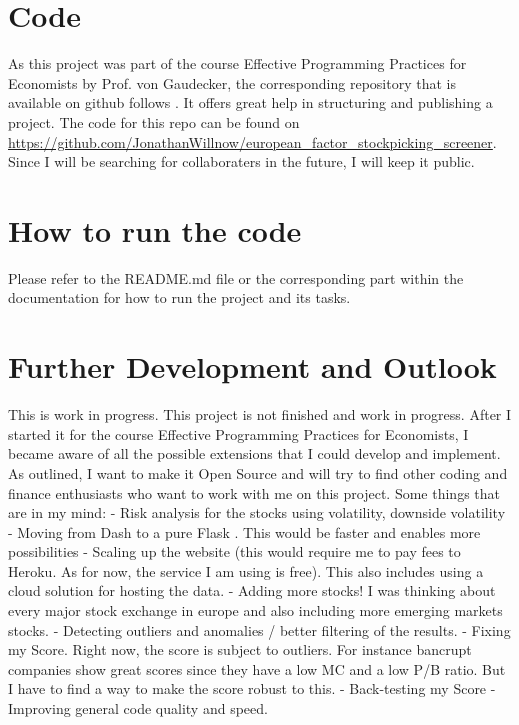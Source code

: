 \documentclass[11pt, a4paper, leqno]{article}
\begin{document}
\section{Code}
As this project was part of the course Effective Programming Practices for Economists by Prof. von Gaudecker, the corresponding repository 
that is available on github follows \citet{GaudeckerEconProjectTemplates}. It offers great help in structuring and publishing a project. 
The code for this repo can be found on \url{https://github.com/JonathanWillnow/european_factor_stockpicking_screener}. Since I will be searching for collaboraters in the future, I will keep it public.

\section{How to run the code}
Please refer to the README.md file or the corresponding part within the documentation for how to run the project and its tasks.

\section{Further Development and Outlook}
This is work in progress. This project is not finished and work in progress. After I started it for the course Effective Programming Practices for Economists, 
I became aware of all the possible extensions that I could develop and implement. 
As outlined, I want to make it Open Source and will try to find other coding and finance enthusiasts who want to work with me on this project.
Some things that are in my mind:
- Risk analysis for the stocks using volatility, downside volatility
- Moving from Dash to a pure Flask . This would be faster and enables more possibilities
- Scaling up the website (this would require me to pay fees to Heroku. As for now, the service I am using is free). This also includes using a cloud solution for hosting the data.
- Adding more stocks! I was thinking about every major stock exchange in europe and also including more emerging markets stocks.
- Detecting outliers and anomalies / better filtering of the results.
- Fixing my Score. Right now, the score is subject to outliers. For instance bancrupt companies show great scores since they have a low MC and a low P/B ratio. But I have to find a way to make the score robust to this.
- Back-testing my Score
- Improving general code quality and speed.



\printbibliography
{}





\end{document}
